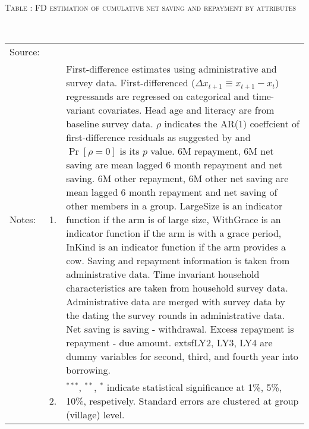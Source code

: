 \hspace{-1cm}\begin{minipage}[t]{14cm}
\hfil\textsc{\normalsize Table \thetable: FD estimation of cumulative net saving and repayment by attributes\label{tab FD saving attributes original HH}}\\
\setlength{\tabcolsep}{1pt}
\setlength{\baselineskip}{8pt}
\renewcommand{\arraystretch}{.55}
\hspace{-.75cm}\\
\renewcommand{\arraystretch}{.8}
\setlength{\tabcolsep}{1pt}
\begin{tabular}{>{\hfill\scriptsize}p{1cm}<{}>{\hfill\scriptsize}p{.25cm}<{}>{\scriptsize}p{12cm}<{\hfill}}
Source:& \multicolumn{2}{l}{\scriptsize Estimated with GUK administrative and survey data.}\\
Notes: & 1. & First-difference estimates using administrative and survey data. First-differenced ($\Delta x_{t+1}\equiv x_{t+1} - x_{t}$) regressands are regressed on categorical and time-variant covariates. Head age and literacy are from baseline survey data. $\rho$ indicates the AR(1) coeffcient of first-difference residuals as suggested by \citet[][10.71]{Wooldridge2010} and $\Pr[\rho=0]$ is its $p$ value. \textsf{6M repayment, 6M net saving} are mean lagged 6 month repayment and net saving. \textsf{6M other repayment, 6M other net saving} are mean lagged 6 month repayment and net saving of other members in a group. \textsf{LargeSize} is an indicator function if the arm is of large size, \textsf{WithGrace} is an indicator function if the arm is with a grace period, \textsf{InKind} is an indicator function if the arm provides a cow. Saving and repayment information is taken from administrative data. Time invariant household characteristics are taken from household survey data. Administrative data are merged with survey data by the dating the survey rounds in administrative data. Net saving is saving - withdrawal. Excess repayment is repayment - due amount. 	extsf{LY2, LY3, LY4} are dummy variables for second, third, and fourth year into borrowing.\\
& 2. & ${}^{***}$, ${}^{**}$, ${}^{*}$ indicate statistical significance at 1\%, 5\%, 10\%, respetively. Standard errors are clustered at group (village) level.
\end{tabular}
\end{minipage}

